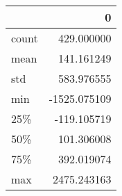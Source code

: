 \begin{tabular}{lr}
\toprule
{} &            0 \\
\midrule
count &   429.000000 \\
mean  &   141.161249 \\
std   &   583.976555 \\
min   & -1525.075109 \\
25\%   &  -119.105719 \\
50\%   &   101.306008 \\
75\%   &   392.019074 \\
max   &  2475.243163 \\
\bottomrule
\end{tabular}
